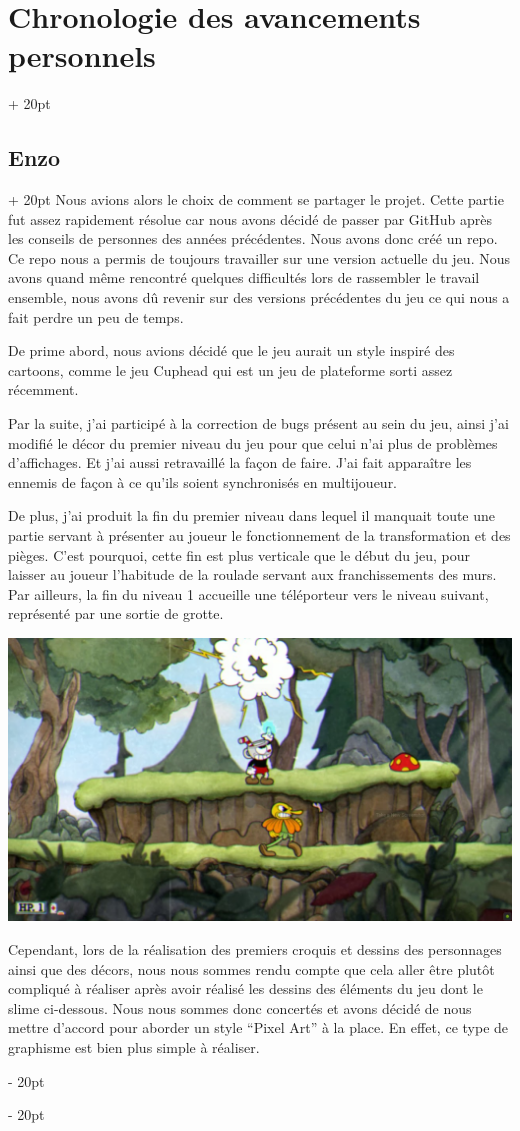\documentclass[a4paper, 12pt, twoside]{article}
\newcommand{\ind}[1][20pt]{\advance\leftskip + #1}
\newcommand{\deind}[1][20pt]{\advance\leftskip - #1}
\newenvironment{indt}[2][20pt]{#2 \par \ind[#1]}{\par \deind} %
\begin{document}
\begin{indt}{\section{Chronologie des avancements personnels}}
\begin{indt}{\subsection{Enzo}}
            Nous avions alors le choix de comment se partager le projet. Cette partie fut assez rapidement résolue car nous avons décidé de passer par GitHub après les conseils de personnes des années précédentes. Nous avons donc créé un repo. Ce repo nous a permis de toujours travailler sur une version actuelle du jeu. Nous avons quand même rencontré quelques difficultés lors de rassembler le travail ensemble, nous avons dû revenir sur des versions précédentes du jeu ce qui nous a fait perdre un peu de temps.
        	
            De prime abord, nous avions décidé que le jeu aurait un style inspiré des cartoons, comme le jeu Cuphead qui est un jeu de plateforme sorti assez récemment.
            
            Par la suite, j'ai participé à la correction de bugs présent au sein du jeu, ainsi j'ai modifié le décor du premier niveau du jeu pour que celui n'ai plus de problèmes d'affichages. Et j'ai aussi retravaillé la façon de faire. J'ai fait apparaître les ennemis de façon à ce qu'ils soient synchronisés en multijoueur.

            De plus, j'ai produit la fin du premier niveau dans lequel il manquait toute une partie servant à présenter au joueur le fonctionnement de la transformation et des pièges. C'est pourquoi, cette fin est plus verticale que le début du jeu, pour laisser au joueur l'habitude de la roulade servant aux franchissements des murs. Par ailleurs, la fin du niveau 1 accueille une téléporteur vers le niveau suivant, représenté par une sortie de grotte.

            \begin{center}
                \includegraphics[width=0.8\linewidth]{Cuphead.png}
            \end{center}

            Cependant, lors de la réalisation des premiers croquis et dessins des personnages ainsi que des décors, nous nous sommes rendu compte que cela aller être plutôt compliqué à réaliser après avoir réalisé les dessins des éléments du jeu dont le slime ci-dessous. Nous nous sommes donc concertés et avons décidé de nous mettre d'accord pour aborder un style “Pixel Art” à la place. En effet, ce type de graphisme est bien plus simple à réaliser.


\end{indt}
\end{indt}
\end{document}
